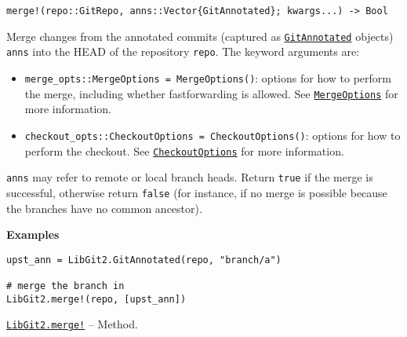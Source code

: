 \begin{adjustwidth}{2em}{0pt}


\begin{verbatim}
merge!(repo::GitRepo, anns::Vector{GitAnnotated}; kwargs...) -> Bool
\end{verbatim}

Merge changes from the annotated commits (captured as \hyperlink{9263689983564368210}{\texttt{GitAnnotated}} objects) \texttt{anns} into the HEAD of the repository \texttt{repo}. The keyword arguments are:

\begin{itemize}
\item \texttt{merge\_opts::MergeOptions = MergeOptions()}: options for how to perform the merge, including whether fastforwarding is allowed. See \hyperlink{7663922722360889557}{\texttt{MergeOptions}} for more information.


\item \texttt{checkout\_opts::CheckoutOptions = CheckoutOptions()}: options for how to perform the checkout. See \hyperlink{16441061243067746546}{\texttt{CheckoutOptions}} for more information.

\end{itemize}
\texttt{anns} may refer to remote or local branch heads. Return \texttt{true} if the merge is successful, otherwise return \texttt{false} (for instance, if no merge is possible because the branches have no common ancestor).

\textbf{Examples}


\begin{verbatim}
upst_ann = LibGit2.GitAnnotated(repo, "branch/a")

# merge the branch in
LibGit2.merge!(repo, [upst_ann])
\end{verbatim}



\end{adjustwidth}
\hypertarget{12065883023146126685}{}
\hyperlink{12065883023146126685}{\texttt{LibGit2.merge!}}  -- {Method.}

